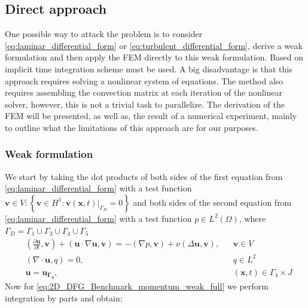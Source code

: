 \subsection{Direct approach}
One possible way to attack the problem is to consider \cref{eq:laminar_differential_form} or \cref{eq:turbulent_differential_form}, derive a weak formulation and then apply the FEM directly to this weak formulation. Based on \cite{gresho-fem} implicit time integration scheme must be used. A big disadvantage is that this approach requires solving a nonlinear system of equations. The method also requires assembling the convection matrix at each iteration of the nonlinear solver, however, this is not a trivial task to parallelize. The derivation of the FEM will be presented, as well as, the result of a numerical experiment, mainly to outline what the limitations of this approach are for our purposes.
\subsubsection{Weak formulation}
We start by taking the dot products of both sides of the first equation from \cref{eq:laminar_differential_form} with a test function $\mathbf{v} \in V : \left\{\mathbf{v} \in H^1 : \mathbf{v}(\mathbf{x}, t)|_{\Gamma_D} = 0 \right\}$ and both sides of the second equation from \cref{eq:laminar_differential_form} with a test function $p \in L^2(\Omega)$, where $\Gamma_D = \Gamma_1\cup\Gamma_3\cup\Gamma_4\cup\Gamma_5$
\begin{align} \label{eq:2D_DFG_Benchmark_momentum_weak_full}
  &\left(\frac{\partial\mathbf{u}}{\partial t}, \mathbf{v}\right) + (\mathbf{u}\cdot\nabla\mathbf{u}, \mathbf{v}) = -(\nabla p, \mathbf{v}) + \nu(\Delta\mathbf{u}, \mathbf{v}), &&\mathbf{v} \in V \\
  &(\nabla\cdot\mathbf{u}, q) = 0, &&q \in L^2 \\
  &\mathbf{u} = \mathbf{u_{\Gamma_4}}, &&\left(\mathbf{x}, t\right) \in \Gamma_4 \times J
\end{align}
Now for \cref{eq:2D_DFG_Benchmark_momentum_weak_full} we perform integration by parts and obtain:

